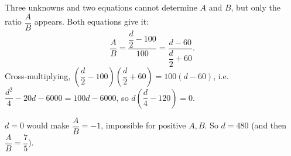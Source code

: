 Three unknowns and two equations cannot determine $A$ and $B$, but only the ratio $\dfrac AB$ appears. Both equations give it:
\[\dfrac AB=\dfrac{\dfrac d2-100}{100}=\dfrac{d-60}{\dfrac d2+60}.\]
Cross-multiplying, $\left(\dfrac d2-100\right)\left(\dfrac d2+60\right)=100(d-60)$, i.e. $\dfrac{d^2}4-20d-6000=100d-6000$, so $d\left(\dfrac d4-120\right)=0$.

$d=0$ would make $\dfrac AB=-1$, impossible for positive $A,B$. So $d=\boxed{480}$ (and then $\dfrac AB=\dfrac{7}{5}$).

